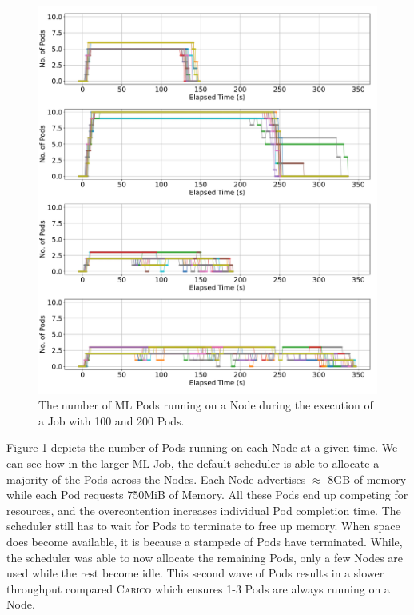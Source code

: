 \begin{figure}[ht!]
    \centering
    \includegraphics[width=\textwidth]{images/ml-running-pods.pdf}
    \caption{The number of ML Pods running on a Node during the
    execution of a Job with 100 and 200 Pods.}
    \label{fig:ml-pod-running}
\end{figure}
Figure \ref{fig:ml-pod-running} depicts the number of Pods running on each Node
at a given time. We can see how in the larger ML Job, the default scheduler is
able to allocate a majority of the Pods across the Nodes. Each Node advertises
$\approx$ 8GB of memory while each Pod requests 750MiB of Memory. All these Pods
end up competing for resources, and the overcontention increases individual
Pod completion time. The scheduler still has to wait for Pods to terminate to
free up memory. When space does become available, it is because a
stampede of Pods have terminated. While, the scheduler was able to now allocate
the remaining Pods, only a few Nodes are used while the rest become idle. This
second wave of Pods results in a slower throughput compared \textsc{Carico} which ensures
1-3 Pods are always running on a Node.

